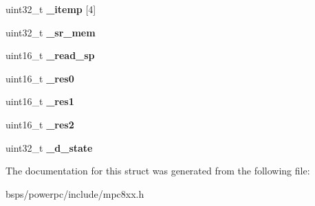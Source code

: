 \begin{DoxyCompactItemize}
\item 
\mbox{\label{structm8xxIDMAparms___afde07560eccaf8f3293c52623d27afa2}} 
uint32\+\_\+t {\bfseries \+\_\+itemp} \mbox{[}4\mbox{]}
\item 
\mbox{\label{structm8xxIDMAparms___ae436526563730aa1625628ef3d0449e7}} 
uint32\+\_\+t {\bfseries \+\_\+sr\+\_\+mem}
\item 
\mbox{\label{structm8xxIDMAparms___ad793ff3939b7fa9858dba345b328854e}} 
uint16\+\_\+t {\bfseries \+\_\+read\+\_\+sp}
\item 
\mbox{\label{structm8xxIDMAparms___a764b955dea985ee20136587c0704b6fe}} 
uint16\+\_\+t {\bfseries \+\_\+res0}
\item 
\mbox{\label{structm8xxIDMAparms___a437293c6f63798e1456ea75588d67140}} 
uint16\+\_\+t {\bfseries \+\_\+res1}
\item 
\mbox{\label{structm8xxIDMAparms___adb0c3c973ee12ef461739427b94df513}} 
uint16\+\_\+t {\bfseries \+\_\+res2}
\item 
\mbox{\label{structm8xxIDMAparms___add2084a4e2ff82d9ac032a31f14c2f2a}} 
uint32\+\_\+t {\bfseries \+\_\+d\+\_\+state}
\end{DoxyCompactItemize}


The documentation for this struct was generated from the following file\+:\begin{DoxyCompactItemize}
\item 
bsps/powerpc/include/mpc8xx.\+h\end{DoxyCompactItemize}
